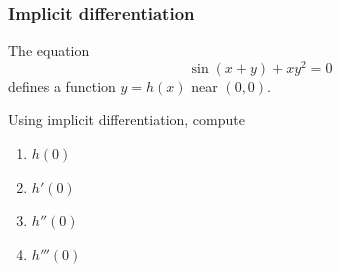 \documentclass[14pt]{beamer}
\newcommand {\DS} [1] {${\displaystyle #1}$}
\begin{document}
\begin{frame}[t]
\frametitle{Implicit differentiation}

The equation
	$$
		\sin (x+y) + xy^2 = 0
	$$
defines a function \DS{y=h(x)} near $(0,0)$.
\href{https://www.desmos.com/calculator/bvupq00r6s}{}


Using implicit differentiation, compute
	\begin{multicols}{4}
	\begin{enumerate}
		\item \DS{h(0)}
		\item \DS{h'(0)}
		\item \DS{h''(0)}
		\item \DS{h'''(0)}
	\end{enumerate}
	\end{multicols}
\end{frame}

\end{document}
